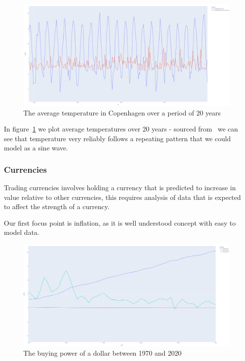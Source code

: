 \begin{figure}
    \centering
    \includegraphics[width=12cm]{figures/real_data_examples/cph_average_temp}
    \caption{The average temperature in Copenhagen over a period of 20 years}
    \label{fig:real_data_climate_cph}
\end{figure}

In figure~\ref{fig:real_data_climate_cph} we plot average temperatures over 20 years - sourced from~\cite{KaggleTemperature}
we can see that temperature very reliably follows a repeating pattern that we could model as a sine wave.

\subsubsection{Currencies}

Trading currencies involves holding a currency that is predicted to increase in value relative to other currencies,
this requires analysis of data that is expected to affect the strength of a currency.

Our first focus point is inflation, as it is well understood concept with easy to model data.

\begin{figure}
    \centering
    \includegraphics[width=12cm]{figures/real_data_examples/dollar_value_statistics}
    \caption{The buying power of a dollar between 1970 and 2020}
    \label{fig:real_data_inflation}
\end{figure}

